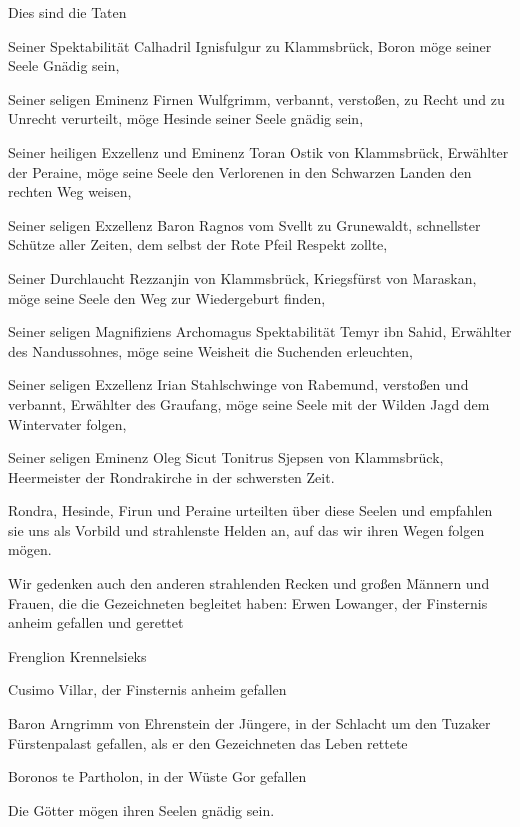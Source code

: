 \documentclass[11pt]{scrreprt}
\begin{document}
Dies sind die Taten\par\smallskip
Seiner Spektabilität Calhadril Ignisfulgur zu Klammsbrück, Boron möge seiner Seele Gnädig sein,\par
Seiner seligen Eminenz Firnen Wulfgrimm, verbannt, verstoßen, zu Recht und zu Unrecht verurteilt, möge Hesinde seiner Seele gnädig sein,\par\smallskip
Seiner heiligen Exzellenz und Eminenz Toran Ostik von Klammsbrück, Erwählter der Peraine, möge seine Seele den Verlorenen in den Schwarzen Landen den rechten Weg weisen,\par\smallskip
Seiner seligen Exzellenz Baron Ragnos vom Svellt zu Grunewaldt, schnellster Schütze aller Zeiten, dem selbst der Rote Pfeil  Respekt zollte,\par\smallskip
Seiner Durchlaucht Rezzanjin von Klammsbrück, Kriegsfürst von Maraskan, möge seine Seele den Weg zur Wiedergeburt finden,\par\smallskip
Seiner seligen Magnifiziens Archomagus Spektabilität Temyr ibn Sahid, Erwählter des Nandussohnes, möge seine Weisheit die Suchenden erleuchten,\par\smallskip
Seiner seligen Exzellenz Irian Stahlschwinge von Rabemund, verstoßen und verbannt, Erwählter des Graufang, möge seine Seele mit der Wilden Jagd dem Wintervater folgen,\par\smallskip
Seiner seligen Eminenz Oleg Sicut Tonitrus Sjepsen von Klammsbrück, Heermeister der Rondrakirche in der schwersten Zeit.\par\smallskip
Rondra, Hesinde, Firun und Peraine urteilten über diese Seelen und empfahlen sie uns als Vorbild und strahlenste Helden an, auf das wir ihren Wegen folgen mögen.\par\medskip

Wir gedenken auch den anderen strahlenden Recken und großen Männern und Frauen, die die Gezeichneten begleitet haben:
Erwen Lowanger, der Finsternis anheim gefallen und gerettet\par
Frenglion Krennelsieks\par
Cusimo Villar, der Finsternis anheim gefallen\par
Baron Arngrimm von Ehrenstein der Jüngere, in der Schlacht um den Tuzaker Fürstenpalast gefallen, als er den Gezeichneten das Leben rettete\par
Boronos te Partholon, in der Wüste Gor gefallen\par
Die Götter mögen ihren Seelen gnädig sein.\par\medskip
\end{document}
